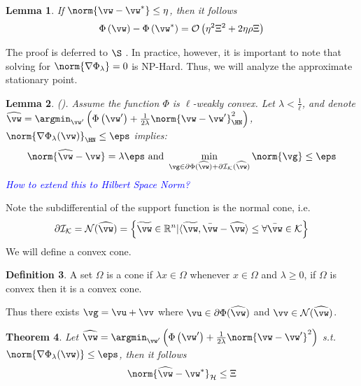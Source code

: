 \documentclass{article} %
\theoremstyle{plain}
\newtheorem{thm}{Theorem}
\newtheorem{lemma}[thm]{Lemma}
\theoremstyle{definition}
\newtheorem{definition}[thm]{Definition}
\theoremstyle{remark}
\newcommand{\Ccref}[1]{\textcolor{black}{\Cref{#1}}}
\begin{document}
	\begin{lemma} \label{lem:phi-from-w-star-w}
		If $\norm{\vw - \vw^*} \leq \eta$, then it follows
		\begin{equation}
			\Phi\left(\vw\right) - \Phi\left(\vw^*\right) = \mathcal{O}\left( \eta^2 \Xi^2 + 2 \eta \rho \Xi \right)
		\end{equation}
	\end{lemma}
	The proof is deferred to $\S$ \Ccref{sec:phi-from-w-star-w}. 
	In practice, however, it is important to note that solving for  $\norm{\nabla\Phi_\lambda} = 0$ is NP-Hard. Thus, we will analyze the approximate stationary point. 
	\begin{lemma}
		\label{lem:moreau-envelope-gradient-small}
		(\cite{Rockafellar1970,rockafellar:2015}). Assume the function $\Phi$ is $\ell$-weakly convex. Let $\lambda < \frac{1}{\ell}$, and denote \\$\widehat{\vw} = \argmin_{\vw'}\left(\Phi\left(\vw'\right) + \frac{1}{2\lambda}\norm{\vw - \vw'}_{\HN}^2\right)$, $\norm{\nabla \Phi_{\lambda}(\vw)}_{\HN}\leq \eps$ implies:
		\begin{equation}
			\norm{\widehat{\vw}- \vw} = \lambda \eps \text{ and } \min_{\vg \in \partial\Phi(\widehat{\vw}) + \partial\mathcal{I}_{\mathcal{K}}(\widehat{\vw})}\norm{\vg}\leq \eps
		\end{equation}
		\textcolor{blue}{How to extend this to Hilbert Space Norm?}
	\end{lemma}
	Note the subdifferential of the support function is the normal cone, i.e.
	\begin{equation}
		\partial\mathcal{I}_{\mathcal{K}} = \mathcal{N}(\widehat{\vw}) = \left\{\widetilde{\vw} \in \mathbb{R}^n \vert \langle\widetilde{\vw},\bar{\vw} - \widehat{\vw}\rangle \leq \forall \bar{\vw} \in \mathcal{K} \right\}
	\end{equation}
	We will define a convex cone. 
	\begin{definition}
		A set $\Omega$ is a cone if $\lambda x \in \Omega$ whenever $x \in \Omega$ and $\lambda \geq 0$, if $\Omega$ is convex then it is a convex cone.
	\end{definition}
	Thus there exists $\vg = \vu + \vv$ where $\vu \in \partial \Phi(\widehat{\vw})$ and $\vv \in \mathcal{N}(\widehat{\vw})$. 
	
	\begin{thm}
		Let $\widehat{\vw} = \argmin_{\vw'}\left(\Phi\left(\vw'\right) + \frac{1}{2\lambda}\norm{\vw - \vw'}^2\right)$ s.t. $\norm{\nabla\Phi_{\lambda}(\vw)}\leq \eps$, then it follows
		\begin{equation}
			\norm{\widehat{\vw} - \vw^*}_{\mathcal{H}} \leq \Xi
		\end{equation}
	\end{thm}
	
\end{document}
